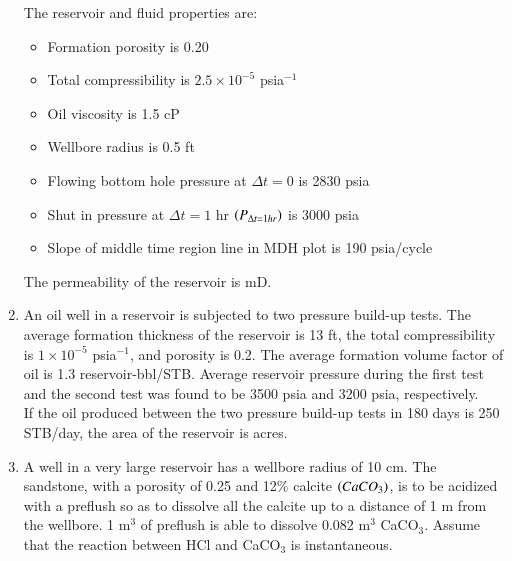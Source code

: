 \documentclass[journal,12pt,onecolumn]{IEEEtran}
\theoremstyle{remark}
\begin{document}
\begin{enumerate}
The reservoir and fluid properties are: 

\begin{itemize}
\item Formation porosity is 0.20
\item Total compressibility is $2.5 \times 10^{-5}$ psia$^{-1}$
\item Oil viscosity is 1.5 cP
\item Wellbore radius is 0.5 ft
\item Flowing bottom hole pressure at $\Delta t = 0$ is 2830 psia
\item Shut in pressure at $\Delta t = 1$ hr $\left(P_{\Delta t=1hr}\right)$ is 3000 psia
\item Slope of middle time region  line in MDH plot is 190 psia/cycle
\end{itemize}

The permeability of the reservoir is \underline{\hspace{2cm}} mD.  

\hfill{}

\item An oil well  in a reservoir is subjected to two pressure build-up tests. The average formation thickness of the reservoir is 13 ft, the total compressibility is $1\times10^{-5}$ psia$^{-1}$, and porosity is 0.2. The average formation volume factor of oil is 1.3 reservoir-bbl/STB. Average reservoir pressure during the first test and the second test was found to be 3500 psia and 3200 psia, respectively. \\ 
If the oil produced between the two pressure build-up tests in 180 days is 250 STB/day, the area of the reservoir is \underline{\hspace{2cm}} acres.  \\ 

\hfill{}

\item A well in a very large reservoir has a wellbore radius of 10 cm. The sandstone, with a porosity of 0.25 and 12\%  calcite $\left(CaCO_3\right)$, is to be acidized with a preflush  so as to dissolve all the calcite up to a distance of 1 m from the wellbore. 1 m$^3$ of preflush is able to dissolve 0.082 m$^3$ CaCO$_3$. Assume that the reaction between HCl and CaCO$_3$ is instantaneous. 


\end{enumerate}
\end{document}
